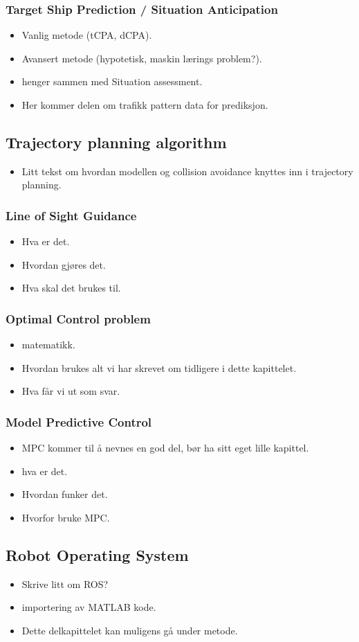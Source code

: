 \subsubsection{Target Ship Prediction / Situation Anticipation}
\begin{itemize}
    \item Vanlig metode (tCPA, dCPA).
    \item Avansert metode (hypotetisk, maskin lærings problem?).
    \item henger sammen med Situation assessment.
    \item Her kommer delen om trafikk pattern data for prediksjon.
\end{itemize}

\subsection{Trajectory planning algorithm}
\begin{itemize}
    \item Litt tekst om hvordan modellen og collision avoidance knyttes inn i trajectory planning.
\end{itemize}

\subsubsection{Line of Sight Guidance}
\begin{itemize}
    \item Hva er det.
    \item Hvordan gjøres det.
    \item Hva skal det brukes til.
\end{itemize}

\subsubsection{Optimal Control problem}
\begin{itemize}
    \item matematikk.
    \item Hvordan brukes alt vi har skrevet om tidligere i dette kapittelet.
    \item Hva får vi ut som svar.
\end{itemize}

\subsubsection{Model Predictive Control}
\begin{itemize}
    \item MPC kommer til å nevnes en god del, bør ha sitt eget lille kapittel.
    \item hva er det.
    \item Hvordan funker det.
    \item Hvorfor bruke MPC.
\end{itemize}

\subsection{Robot Operating System}
\begin{itemize}
    \item Skrive litt om ROS?
    \item importering av MATLAB kode.
    \item Dette delkapittelet kan muligens gå under metode.
\end{itemize}

\newpage